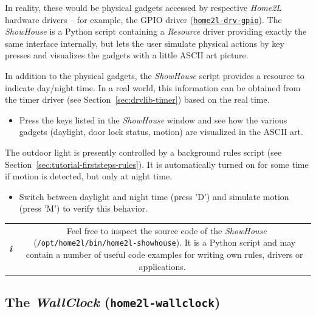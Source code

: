 \documentclass[12pt,english,parskip=half]{scrreprt}
\newcommand{\infobox}[1]{
  \hfill
  \setlength\arrayrulewidth{1pt}
  \begin{tabular}[t]{c|c|}
    \parbox{1.8em}{\hfill\textit{\Huge\textbf{i}\,}}
    &
    \,\parbox{0.89\linewidth}{\setlength{\parskip}{0.5em}#1}\,
  \end{tabular}
  \par
}
\newcommand{\idx}[1]{#1\index{#1}}
\newcommand{\toolref}[1]{\hyperref[tool:#1]{\texttt{\idx{#1}}}}
\begin{document}
In reality, these would be physical gadgets accessed by respective
\emph{Home2L} hardware drivers -- for example, the GPIO driver (\toolref{home2l-drv-gpio}).
The \emph{ShowHouse} is a Python script containing a \emph{Resource}
driver providing exactly the same interface internally, but lets the
user simulate physical actions by key presses and visualizes the gadgets
with a little ASCII art picture.

In addition to the physical gadgets, the \emph{ShowHouse} script provides
a resource to indicate day/night time. In a real world, this information can
be obtained from the timer driver (see Section~\ref{sec:drvlib-timer})
based on the real time.

\begin{itemize}[$\blacktriangleright$]

\item
  Press the keys listed in the \emph{ShowHouse} window and see how the various gadgets
  (daylight, door lock status, motion) are visualized in the ASCII art.

\end{itemize}

The outdoor light is presently controlled by a background rules script
(see Section~\ref{sec:tutorial-firststeps-rules}).
It is automatically turned on for some time if motion is detected, but only at night time.

\begin{itemize}[$\blacktriangleright$]

\item
  Switch between daylight and night time (press 'D') and simulate motion
  (press 'M') to verify this behavior.

\end{itemize}


\infobox{
  Feel free to inspect the source code of the \emph{ShowHouse}
  (\texttt{/opt/home2l/bin/home2l-showhouse}). It is a Python script and may contain
  a number of useful code examples for writing own rules, drivers or applications.
}



\subsection{The \emph{WallClock} (\texttt{home2l-wallclock})}
\label{sec:tutorial-firststeps-wallclock}
\end{document}
